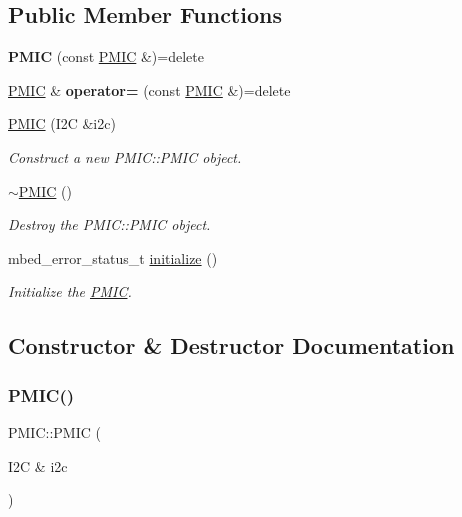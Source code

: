 \subsection*{Public Member Functions}
\begin{DoxyCompactItemize}
\item 
\mbox{\label{class_p_m_i_c_a450469089bc43da3e0e32510fe4ff34d}} 
{\bfseries P\+M\+IC} (const \mbox{\hyperlink{class_p_m_i_c}{P\+M\+IC}} \&)=delete
\item 
\mbox{\label{class_p_m_i_c_ac9f5ecb5ee78181541fa5bbd2cbfe567}} 
\mbox{\hyperlink{class_p_m_i_c}{P\+M\+IC}} \& {\bfseries operator=} (const \mbox{\hyperlink{class_p_m_i_c}{P\+M\+IC}} \&)=delete
\item 
\mbox{\hyperlink{class_p_m_i_c_ab687d3b9ff14729e6ea439fd246f542f}{P\+M\+IC}} (I2C \&i2c)
\begin{DoxyCompactList}\small\item\em Construct a new P\+M\+I\+C\+::\+P\+M\+IC object. \end{DoxyCompactList}\item 
\mbox{\hyperlink{class_p_m_i_c_a68ddf66e3dab8a38dac9f026cfbb2b30}{$\sim$\+P\+M\+IC}} ()
\begin{DoxyCompactList}\small\item\em Destroy the P\+M\+I\+C\+::\+P\+M\+IC object. \end{DoxyCompactList}\item 
mbed\+\_\+error\+\_\+status\+\_\+t \mbox{\hyperlink{class_p_m_i_c_ae899cdd3d66ecef345c748f9c42b5399}{initialize}} ()
\begin{DoxyCompactList}\small\item\em Initialize the \mbox{\hyperlink{class_p_m_i_c}{P\+M\+IC}}. \end{DoxyCompactList}\end{DoxyCompactItemize}


\subsection{Constructor \& Destructor Documentation}
\mbox{\label{class_p_m_i_c_ab687d3b9ff14729e6ea439fd246f542f}} 
\subsubsection{\texorpdfstring{PMIC()}{PMIC()}}
{\footnotesize\ttfamily P\+M\+I\+C\+::\+P\+M\+IC (\begin{DoxyParamCaption}\item[{I2C \&}]{i2c }\end{DoxyParamCaption})}



